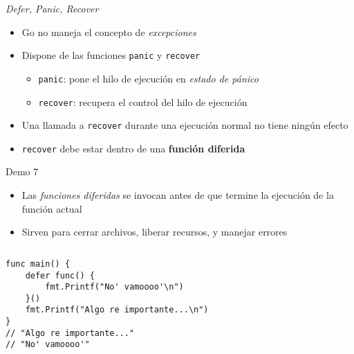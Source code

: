 \begin{frame}[fragile]{\emph{Defer, Panic, Recover}}
    \begin{itemize}
        \item Go no maneja el concepto de \emph{excepciones} 
        \item Dispone de las funciones \texttt{panic} y \texttt{recover}  
        \begin{itemize}
            \item \texttt{panic}: pone el hilo de ejecución en \emph{estado de pánico}  
            \item \texttt{recover}: recupera el control del hilo de ejecución 
        \end{itemize}
        \item Una llamada a \texttt{recover} durante una ejecución normal no tiene ningún efecto 
        \item \texttt{recover} debe estar dentro de una \textbf{función diferida}  
    \end{itemize}
\end{frame}



\begin{frame}[fragile]{Demo 7}

    \begin{itemize}
        \item Las \emph{funciones diferidas} se invocan antes de que termine la ejecución de la función actual
        \item Sirven para cerrar archivos, liberar recursos, y manejar errores
    \end{itemize}
{
    \renewcommand{\baselinestretch}{1} 

    \begin{columns}
        \begin{lstlisting}[title={Función diferida}]
func main() {
    defer func() {
        fmt.Printf("No' vamoooo'\n")
    }()
    fmt.Printf("Algo re importante...\n")
}
// "Algo re importante..."
// "No' vamoooo'"
        \end{lstlisting}
    \end{columns}
}

\end{frame}

